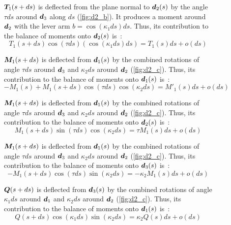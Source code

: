 \begin{figure}[p]
\begin{fullpage}
		$\boldsymbol{T}_1(s+ds)$ is deflected from the plane normal to $\boldsymbol{d}_2(s)$ by the angle $\tau ds$ around $\boldsymbol{d}_3$ along $ds$ (\cref{fig:d2_b}). It produces a moment around $\boldsymbol{d}_2$ with the lever arm $b =  \cos(\kappa_1 ds) ds$. Thus, its contribution to the balance of moments onto $\boldsymbol{d}_2(s)$ is~: 
	\begin{equation*}
		T_1(s+ds) \cos(\tau ds) (\cos(\kappa_1 ds) ds) = T_1(s) ds + o(ds)
	\end{equation*}
	
	$\boldsymbol{M}_1(s+ds)$ is deflected from $\boldsymbol{d}_1(s)$ by the combined rotations of angle $\tau ds$ around $\boldsymbol{d}_3$ and $\kappa_2 ds$ around $\boldsymbol{d}_2$ (\cref{fig:d2_c}). Thus, its contribution to the balance of moments onto $\boldsymbol{d}_1(s)$ is~: 
	\begin{equation*}
		-M_1(s) + M_1(s+ds) \cos(\tau ds) \cos(\kappa_2 ds) = M'_1 (s) ds + o(ds)
	\end{equation*}	
	
	$\boldsymbol{M}_1(s+ds)$ is deflected from $\boldsymbol{d}_1(s)$ by the combined rotations of angle $\tau ds$ around $\boldsymbol{d}_3$ and $\kappa_2 ds$ around $\boldsymbol{d}_2$ (\cref{fig:d2_c}). Thus, its contribution to the balance of moments onto $\boldsymbol{d}_2(s)$ is~: 
	\begin{equation*}
		M_1(s+ds) \sin(\tau ds) \cos(\kappa_2 ds) = \tau M_1 (s) ds + o(ds)
	\end{equation*}	
	
	$\boldsymbol{M}_1(s+ds)$ is deflected from $\boldsymbol{d}_1(s)$ by the combined rotations of angle $\tau ds$ around $\boldsymbol{d}_3$ and $\kappa_2 ds$ around $\boldsymbol{d}_2$ (\cref{fig:d2_c}). Thus, its contribution to the balance of moments onto $\boldsymbol{d}_3(s)$ is~: 
	\begin{equation*}
		-M_1(s+ds) \cos(\tau ds) \sin(\kappa_2 ds) = -\kappa_2 M_1 (s) ds + o(ds)
	\end{equation*}	
	
	$\boldsymbol{Q}(s+ds)$ is deflected from $\boldsymbol{d}_3(s)$ by the combined rotations of angle $\kappa_1 ds$ around $\boldsymbol{d}_1$ and $\kappa_2 ds$ around $\boldsymbol{d}_2$ (\cref{fig:d2_c}). Thus, its contribution to the balance of moments onto $\boldsymbol{d}_1(s)$ is~: 
	\begin{equation*}
		Q(s+ds) \cos(\kappa_1 ds) \sin(\kappa_2 ds) = \kappa_2 Q(s) ds + o(ds)
	\end{equation*}	
	  \end{fullpage}
\end{figure}

\clearpage
